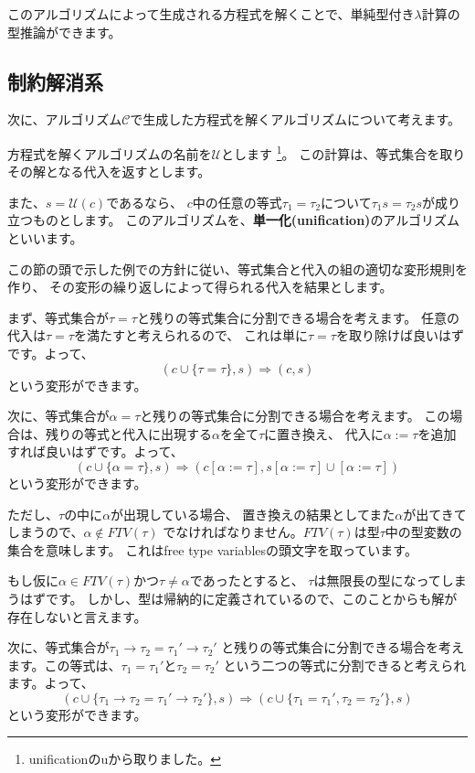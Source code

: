 このアルゴリズムによって生成される方程式を解くことで、単純型付き$\lambda$計算の型推論ができます。

\subsection{制約解消系}

次に、アルゴリズム$\mathcal C$で生成した方程式を解くアルゴリズムについて考えます。

方程式を解くアルゴリズムの名前を$\mathcal U$とします
\footnote{unificationのuから取りました。}。
この計算は、等式集合を取りその解となる代入を返すとします。

また、$s = \mathcal{U}(c)$であるなら、
$c$中の任意の等式$\tau_1 = \tau_2$について$\tau_1 s = \tau_2 s$が成り立つものとします。
このアルゴリズムを、\textbf{単一化(unification)}のアルゴリズムといいます。

この節の頭で示した例での方針に従い、等式集合と代入の組の適切な変形規則を作り、
その変形の繰り返しによって得られる代入を結果とします。

まず、等式集合が$\tau = \tau$と残りの等式集合に分割できる場合を考えます。
任意の代入は$\tau = \tau$を満たすと考えられるので、
これは単に$\tau = \tau$を取り除けば良いはずです。よって、
\[
  (c \cup \{\tau = \tau\}, s) \Longrightarrow (c, s)
\]
という変形ができます。

次に、等式集合が$\alpha = \tau$と残りの等式集合に分割できる場合を考えます。
この場合は、残りの等式と代入に出現する$\alpha$を全て$\tau$に置き換え、
代入に$\alpha := \tau$を追加すれば良いはずです。よって、
\[
  (c \cup \{\alpha = \tau\}, s) \Longrightarrow
  (c[\alpha := \tau], s[\alpha := \tau] \cup [\alpha := \tau])
\]
という変形ができます。

ただし、$\tau$の中に$\alpha$が出現している場合、
置き換えの結果としてまた$\alpha$が出てきてしまうので、$\alpha \notin \mathit{FTV}(\tau)$
でなければなりません。$\mathit{FTV}(\tau)$は型$\tau$中の型変数の集合を意味します。
これはfree type variablesの頭文字を取っています。

もし仮に$\alpha \in \mathit{FTV}(\tau)$かつ$\tau \neq \alpha$であったとすると、
$\tau$は無限長の型になってしまうはずです。
しかし、型は帰納的に定義されているので、このことからも解が存在しないと言えます。

次に、等式集合が$\tau_1 \to \tau_2 = \tau_1' \to \tau_2'$
と残りの等式集合に分割できる場合を考えます。この等式は、$\tau_1 = \tau_1'$と$\tau_2 = \tau_2'$
という二つの等式に分割できると考えられます。よって、
\[
  (c \cup \{\tau_1 \to \tau_2 = \tau_1' \to \tau_2'\}, s) \Longrightarrow
  (c \cup \{\tau_1 = \tau_1', \tau_2 = \tau_2'\}, s)
\]
という変形ができます。

